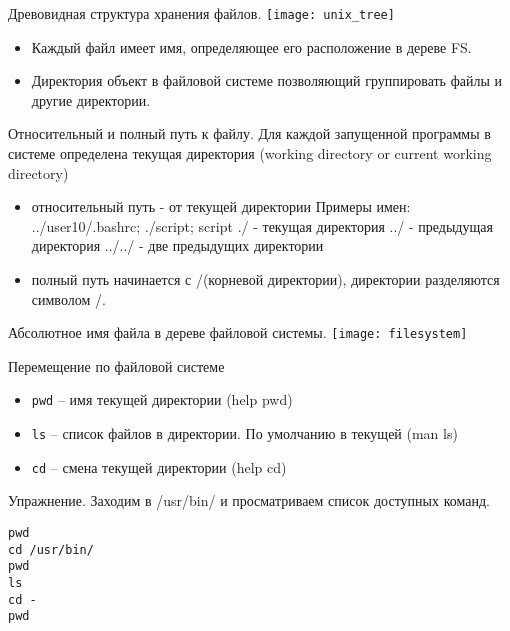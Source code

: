 
\begin{frame}{Древовидная структура хранения файлов.}
\texttt{[image: unix\_tree]} 
  \begin{itemize}
    \item Каждый файл имеет \alert{имя}, определяющее его расположение в дереве FS.
    \item \alert{Директория} объект в файловой системе позволяющий группировать файлы и другие директории.
  \end{itemize}
\end{frame}

\begin{frame}[fragile]{Относительный и полный путь к файлу.}
 Для каждой запущенной программы в системе определена \alert{текущая директория} (working directory or current working directory) 
  \begin{itemize}
    \item \alert{относительный путь} - от текущей директории \newline
      Примеры имен: ../user10/.bashrc; ./script; script \newline
        \alert{./} - текущая директория \newline 
        \alert{../} - предыдущая директория \newline 
        \alert{../../} - две предыдущих директории 
    \item \alert{полный путь} начинается с \alert{/}(корневой директории), директории разделяются символом \alert{/}. \newline
  \end{itemize}
\end{frame}


\begin{frame}{Абсолютное имя файла в дереве файловой системы.}
\texttt{[image: filesystem]} 
\end{frame}

%
%

\begin{frame}[fragile]{Перемещение по файловой системе}
      \begin{itemize}
		  \item {\tt pwd} -- имя текущей директории (help pwd)
		  \item {\tt ls} -- список файлов в директории. По умолчанию в текущей (man ls)
		  \item {\tt cd} -- смена текущей директории (help cd)
      \end{itemize}
      \begin{block}{Упражнение. Заходим в /usr/bin/ и просматриваем список доступных команд.}
\begin{lstlisting}
pwd
cd /usr/bin/
pwd
ls
cd -
pwd
\end{lstlisting}
      \end{block}
\end{frame}



